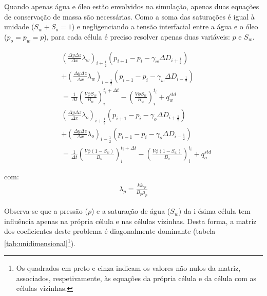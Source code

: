 \documentclass[final,5p]{elsarticle}
\numberwithin{equation}{section}
\begin{document}
        Quando apenas água e óleo estão envolvidos na simulação, apenas duas equações de conservação de massa são necessárias. Como a soma das saturações é igual à unidade ($S_w + S_o = 1$) e negligenciando a tensão interfacial entre a água e o óleo ($p_o = p_w = p$), para cada célula é preciso resolver apenas duas variáveis: $p$ e $S_w$.

        \begin{align}
            &\left( \frac{\Delta y \Delta z}{\Delta x} \lambda_w \right)_{i+\tfrac{1}{2}} (p_{i+1} - p_{i} - \gamma_w \Delta D_{i+\tfrac{1}{2}})  \nonumber \\
            &+ \left( \frac{\Delta y \Delta z}{\Delta x} \lambda_w \right)_{i-\tfrac{1}{2}} (p_{i-1} - p_{i} - \gamma_w \Delta D_{i-\tfrac{1}{2}}) \nonumber \\
            &  = \frac{1}{\Delta t} \left(\frac{V \phi S_w}{B_w}\right)_i^{t_i+\Delta t} - \left(\frac{V \phi S_w}{B_w}\right)_i^{t_i} + q^{std}_w \label{eq:blackoilumdw} \\
            &\left( \frac{\Delta y \Delta z}{\Delta x} \lambda_o \right)_{i+\tfrac{1}{2}} (p_{i+1} - p_{i} - \gamma_o \Delta D_{i+\tfrac{1}{2}})  \nonumber \\
            &+ \left( \frac{\Delta y \Delta z}{\Delta x} \lambda_o \right)_{i-\tfrac{1}{2}} (p_{i-1} - p_{i} - \gamma_o \Delta D_{i-\tfrac{1}{2}}) \nonumber \\
            &  = \frac{1}{\Delta t} \left(\frac{V \phi (1-S_w)}{B_o}\right)_i^{t_i+\Delta t} - \left(\frac{V \phi (1-S_w)}{B_o}\right)_i^{t_i} + q^{std}_o \label{eq:blackoilumdo}
        \end{align}

        \noindent com:
        \begin{align}
            \lambda_p = \frac{k k_{rp}}{B_p \mu_p} \nonumber
        \end{align}

        Observa-se que a pressão ($p$) e a saturação de água ($S_w$) da i-ésima célula tem influência apenas na própria célula e nas células vizinhas. Desta forma, a matriz dos coeficientes deste problema é diagonalmente dominante (tabela \ref{tab:unidimensional}\footnote{Os quadrados em preto e cinza indicam os valores não nulos da matriz, associados, respetivamente, às equações da própria célula e da célula com as células vizinhas.}).
\end{document}
